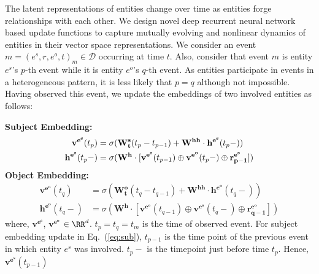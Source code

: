 \documentclass{article}
\begin{document}
The latent representations of entities change over time as entities forge relationships with each other. We design novel deep recurrent neural network based update functions to capture mutually evolving and nonlinear dynamics of entities in their vector space representations. We consider an event $m = (e^s, r, e^o, t)_m \in \mathcal{D}$ occurring at time $t$. Also, consider that event $m$ is entity $e^s$'s $p$-th event while it is entity $e^o$'s $q$-th event. As entities participate in events in a heterogeneous pattern, it is less likely that $p=q$ although not impossible. Having observed this event, we update the embeddings of two involved entities as follows: 

{\bf Subject Embedding:}  
\begin{equation}
\label{eq:sub}
\begin{split}
\mathbf{v^{e^s}}(t_p) &= \sigma(\mathbf{W^{s}_t}(t_p - t_{p-1}) + \mathbf{W^{hh}} \cdot \mathbf{h^{e^s}}(t_{p}-))\\
\mathbf{h^{e^s}}(t_{p}-) &= \sigma(\mathbf{W^h} \cdot [\mathbf{v^{e^s}}(t_{p-1})\oplus\mathbf{v^{e^o}}(t_p-)\oplus\mathbf{r^{e^s}_{p-1}}])
\end{split}
\vspace{-0.5cm}
\end{equation}
{\bf Object Embedding:}  
\begin{equation}
\label{eq:obj}
\begin{split}
\mathbf{v^{e^o}}(t_q) &= \sigma(\mathbf{W^{o}_t}(t_q - t_{q-1}) + \mathbf{W^{hh}} \cdot \mathbf{h^{e^o}}(t_{q}-))\\
\mathbf{h^{e^o}}(t_{q}-) &= \sigma(\mathbf{W^h} \cdot [\mathbf{v^{e^o}}(t_{q-1})\oplus\mathbf{v^{e^s}}(t_q-)\oplus\mathbf{r^{e^o}_{q-1}}])
\end{split}
\end{equation}
where, $\mathbf{v^{e^s}}$, $\mathbf{v^{e^o}}$ $\in \RR^{d}$. $t_p = t_q = t_m$ is the time of observed event. For subject embedding update in Eq.~(\ref{eq:sub}), $t_{p-1}$ is the time point of the previous event in which entity $e^s$ was involved. $t_p-$ is the timepoint just before time $t_p$. Hence, $\mathbf{v^{e^s}}(t_{p-1})$
\end{document}
